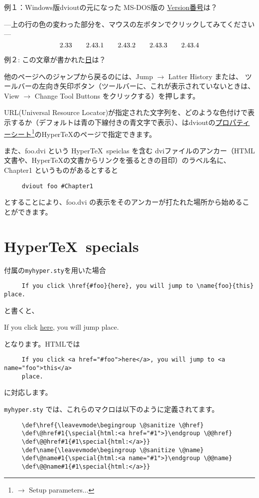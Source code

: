 例１：Windows版dvioutの元になった MS-DOS版の \href{#version}{Version番号}は？

---上の行の色の変わった部分を、マウスの左ボタンでクリックしてみてください---
$$
2.33\quad\quad 2.43.1 \quad\quad 2.43.2\name{version}{\quad}\quad 2.43.3\quad\quad 2.43.4
$$
\medskip

例２: この文章が書かれた\href{#date}{日}は？
\medskip

他のページへのジャンプから戻るのには、Jump $\rightarrow$ Latter History または、
ツールバーの左向き矢印ボタン（ツールバーに、これが表示されていないときは、View
$\rightarrow$ Change Tool Buttons をクリックする）を押します。

URL(Universal Resource Locator)が指定された文字列を、どのような色付けで表示するか（デフォルトは青の下線付きの青文字で表示）、はdvioutの\href{#prop.sheet}{プロパティーシート}\footnote{ $\rightarrow$ Setup parameters$\ldots$}のHyper\TeX のページで指定できます。

また、foo.dvi という Hyper\TeX\ speiclas を含む dviファイルのアンカー（HTML文書や、Hyper\TeX の文書からリンクを張るときの目印）のラベル名に、Chapter1 というものがあるとすると

\begin{verbatim}
     dviout foo #Chapter1
\end{verbatim}

とすることにより、foo.dvi の表示をそのアンカーが打たれた場所から始めることができます。

\section{Hyper\TeX\ specials}

付属の{\tt myhyper.sty}を用いた場合
\begin{verbatim}
     If you click \href{#foo}{here}, you will jump to \name{foo}{this} place.
\end{verbatim}
と書くと、
\medskip


If you click \href{#foo}{here}, you will jump  place.
\medskip

\noindent
となります。HTMLでは
\begin{verbatim}
     If you click <a href="#foo">here</a>, you will jump to <a name="foo">this</a> 
     place.
\end{verbatim}
に対応します。

{\tt myhyper.sty} では、これらのマクロは以下のように定義されてます。
\begin{verbatim}
     \def\href{\leavevmode\begingroup \@sanitize \@href}
     \def\@href#1{\special{html:<a href="#1">}\endgroup \@@href}
     \def\@@href#1{#1\special{html:</a>}}
     \def\name{\leavevmode\begingroup \@sanitize \@name}
     \def\@name#1{\special{html:<a name="#1">}\endgroup \@@name}
     \def\@@name#1{#1\special{html:</a>}}
\end{verbatim}

